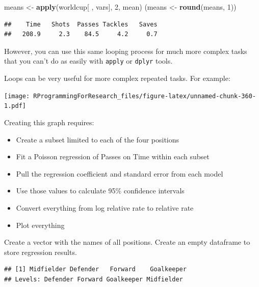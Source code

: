 \documentclass[]{book}
\makeatletter
\newenvironment{Shaded}{\begin{snugshade}}{\end{snugshade}}
\newcommand{\KeywordTok}[1]{\textcolor[rgb]{0.13,0.29,0.53}{\textbf{{#1}}}}
\newcommand{\DecValTok}[1]{\textcolor[rgb]{0.00,0.00,0.81}{{#1}}}
\newcommand{\StringTok}[1]{\textcolor[rgb]{0.31,0.60,0.02}{{#1}}}
\newcommand{\NormalTok}[1]{{#1}}
\providecommand{\tightlist}{%
  \setlength{\itemsep}{0pt}\setlength{\parskip}{0pt}}
\newenvironment{kframe}{%
\medskip{}
\setlength{\fboxsep}{.8em}
 \def\at@end@of@kframe{}%
 \ifinner\ifhmode%
  \def\at@end@of@kframe{\end{minipage}}%
  \begin{minipage}{\columnwidth}%
 \fi\fi%
 \def\FrameCommand##1{\hskip\@totalleftmargin \hskip-\fboxsep
 \colorbox{shadecolor}{##1}\hskip-\fboxsep
     \hskip-\linewidth \hskip-\@totalleftmargin \hskip\columnwidth}%
 \MakeFramed {\advance\hsize-\width
   \@totalleftmargin\z@ \linewidth\hsize
   \@setminipage}}%
 {\par\unskip\endMakeFramed%
 \at@end@of@kframe}
\renewenvironment{Shaded}{\begin{kframe}}{\end{kframe}}
\makeatother
\begin{document}
\begin{Shaded}
\begin{Highlighting}[]
\NormalTok{means <-}\StringTok{ }\KeywordTok{apply}\NormalTok{(worldcup[ , vars], }\DecValTok{2}\NormalTok{, mean)}
\NormalTok{(means <-}\StringTok{ }\KeywordTok{round}\NormalTok{(means, }\DecValTok{1}\NormalTok{))}
\end{Highlighting}
\end{Shaded}

\begin{verbatim}
##    Time   Shots  Passes Tackles   Saves 
##   208.9     2.3    84.5     4.2     0.7
\end{verbatim}

However, you can use this same looping process for much more complex
tasks that you can't do as easily with \texttt{apply} or \texttt{dplyr}
tools.

Loops can be very useful for more complex repeated tasks. For example:

\texttt{[image: RProgrammingForResearch\_files/figure-latex/unnamed-chunk-360-1.pdf]}

Creating this graph requires:

\begin{itemize}
\tightlist
\item
  Create a subset limited to each of the four positions
\item
  Fit a Poisson regression of Passes on Time within each subset
\item
  Pull the regression coefficient and standard error from each model
\item
  Use those values to calculate 95\% confidence intervals
\item
  Convert everything from log relative rate to relative rate
\item
  Plot everything
\end{itemize}

Create a vector with the names of all positions. Create an empty
dataframe to store regression results.

\begin{Shaded}
\end{Shaded}

\begin{verbatim}
## [1] Midfielder Defender   Forward    Goalkeeper
## Levels: Defender Forward Goalkeeper Midfielder
\end{verbatim}
\end{document}
